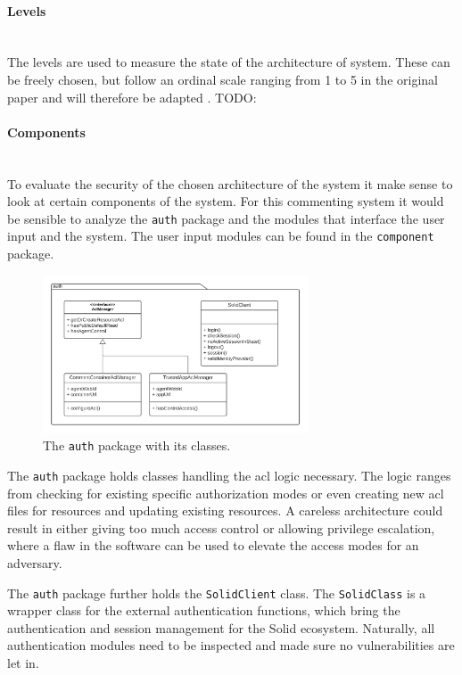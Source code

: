 \paragraph{Levels}\mbox{}\\

The levels are used to measure the state of the architecture of system. These can be freely chosen, but follow an ordinal scale ranging from 1 to 5 in the original paper and will therefore be adapted \cite{asqa-paper}.
TODO:
\vspace{0.5cm}
\paragraph{Components}\mbox{}\\

To evaluate the security of the chosen architecture of the system it make sense to look at certain components of the system. For this commenting system it would be sensible to analyze the \texttt{auth} package and the modules that interface the user input and the system. The user input modules can be found in the \texttt{component} package.

\begin{figure}[!ht]
    \centering
    \includegraphics[width=0.7\textwidth]{prototype/graphs/poc-comment-package-auth.png}
    \caption{The \texttt{auth} package with its classes.}
    \label{fig:poc-comment-package-auth}
\end{figure}

The \texttt{auth} package holds classes handling the \gls{acl} logic necessary. The logic ranges from checking for existing specific authorization modes or even creating new \gls{acl} files for resources and updating existing resources. A careless architecture could result in either giving too much access control or allowing privilege escalation, where a flaw in the software can be used to elevate the access modes for an adversary.

The \texttt{auth} package further holds the \texttt{SolidClient} class. The \texttt{SolidClass} is a wrapper class for the external authentication functions, which bring the authentication and session management for the Solid ecosystem. Naturally, all authentication modules need to be inspected and made sure no vulnerabilities are let in.

